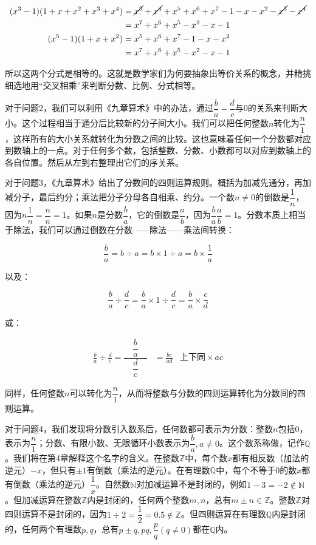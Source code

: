 \documentclass[b5paper]{ctexart}
\begin{document}
\begin{align*}
(x^3 - 1)(1 + x + x^2 + x^3 + x^4) &= \cancel{x^3} + \cancel{x^4} + x^5 + x^6 + x^7 - 1 - x - x^2 - \cancel{x^3} - \cancel{x^4} \\
  &= x^7 + x^6 + x^5 - x^2 - x - 1 \\
(x^5 - 1)(1 + x + x^2) &= x^5 + x^6 + x^7 - 1 - x - x^2 \\
  &= x^7 + x^6 + x^5 - x^2 - x - 1
\end{align*}

所以这两个分式是相等的。这就是数学家们为何要抽象出等价关系的概念，并精挑细选地用“交叉相乘”来判断分数、比例、分式相等。

\vspace{3mm}
对于问题2，我们可以利用《九章算术》中的办法，通过$\dfrac{b}{a} - \dfrac{d}{c}$与0的关系来判断大小。这个过程相当于通分后比较新的分子间大小。我们可以把任何整数$n$转化为$\dfrac{n}{1}$，这样所有的大小关系就转化为分数之间的比较。这也意味着任何一个分数都对应到数轴上的一点。对于任何多个数，包括整数、分数、小数都可以对应到数轴上的各自位置。然后从左到右整理出它们的序关系。

\vspace{3mm}
对于问题3，《九章算术》给出了分数间的四则运算规则。概括为加减先通分，再加减分子，最后约分；乘法把分子分母各自相乘、约分。一个数$n \ne 0$的倒数是$\dfrac{1}{n}$，因为$n\dfrac{1}{n} = \dfrac{n}{n} = 1$。如果$n$是分数$\dfrac{b}{a}$，它的倒数是$\dfrac{a}{b}$，因为$\dfrac{b}{a}\dfrac{a}{b} = 1$。分数本质上相当于除法，我们可以通过倒数在分数——除法——乘法间转换：

\[
\frac{b}{a} = b \div a = b \times 1 \div a = b \times \frac{1}{a}
\]

以及：

\[
\frac{b}{a} \div \frac{d}{c} = \frac{b}{a} \times 1 \div \frac{d}{c} = \frac{b}{a} \times \frac{c}{d}
\]

或：

\begin{align*}
\frac{b}{a} \div \frac{d}{c} = \dfrac{\quad\dfrac{b}{a}\quad}{\dfrac{d}{c}} &= \frac{bc}{ad} & \text{上下同} \times ac
\end{align*}

同样，任何整数$n$可以转化为$\dfrac{n}{1}$，从而将整数与分数的四则运算转化为分数间的四则运算。

\vspace{3mm}
对于问题4，我们发现将分数引入数系后，任何数都可表示为分数：整数$n$包括0，表示为$\dfrac{n}{1}$；分数、有限小数、无限循环小数表示为$\dfrac{b}{a}, a \ne 0$。这个数系称做，记作$\mathbb{Q}$。我们将在第4章解释这个名字的含义。在整数$\mathbb{Z}$中，每个数$x$都有相反数（加法的逆元）$-x$，但只有$\pm 1$有倒数（乘法的逆元）。在有理数$\mathbb{Q}$中，每个不等于0的数$x$都有倒数（乘法的逆元）$\dfrac{1}{x}$。自然数$\mathbb{N}$对加减运算不是封闭的，例如$1 - 3 = -2 \notin \mathbb{N}$。但加减运算在整数$\mathbb{Z}$内是封闭的，任何两个整数$m, n$，总有$m \pm n \in \mathbb{Z}$。整数$\mathbb{Z}$对四则运算不是封闭的，因为$1 \div 2 = \dfrac{1}{2} = 0.5 \notin \mathbb{Z}$。但四则运算在有理数$\mathbb{Q}$内是封闭的，任何两个有理数$p, q$，总有$p \pm q, pq, \dfrac{p}{q} (q \ne 0)$都在$\mathbb{Q}$内。
\end{document}

